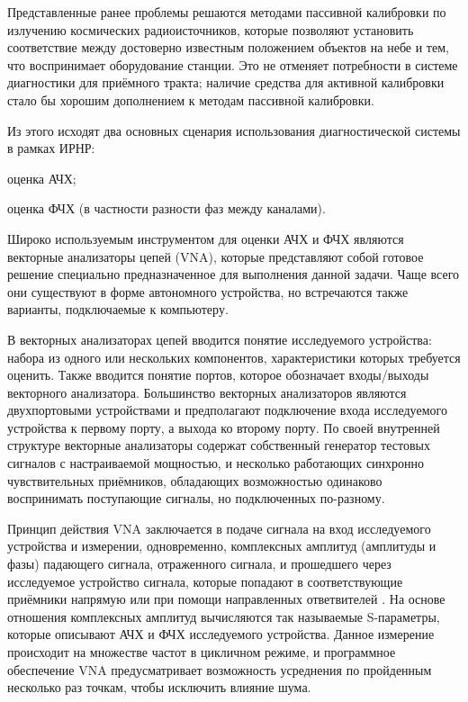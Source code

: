 \documentclass{report}
\begin{document}
Представленные ранее проблемы решаются методами пассивной калибровки по излучению космических радиоисточников, которые позволяют установить соответствие между достоверно известным положением объектов на небе и тем, что воспринимает оборудование станции. Это не отменяет потребности в системе диагностики для приёмного тракта; наличие средства для активной калибровки стало бы хорошим дополнением к методам пассивной калибровки.

Из этого исходят два основных сценария использования диагностической системы в рамках ИРНР:

\begin{enummarker}
    \item оценка АЧХ;
    \item оценка ФЧХ (в частности разности фаз между каналами).
\end{enummarker}

Широко используемым инструментом для оценки АЧХ и ФЧХ являются векторные анализаторы цепей (VNA), которые представляют собой готовое решение специально предназначенное для выполнения данной задачи. Чаще всего они существуют в форме автономного устройства, но встречаются также варианты, подключаемые к компьютеру.

В векторных анализаторах цепей вводится понятие исследуемого устройства: набора из одного или нескольких компонентов, характеристики которых требуется оценить. Также вводится понятие портов, которое обозначает входы/выходы векторного анализатора. Большинство векторных анализаторов являются двухпортовыми устройствами и предполагают подключение входа исследуемого устройства к первому порту, а выхода ко второму порту. По своей внутренней структуре векторные анализаторы содержат собственный генератор тестовых сигналов с настраиваемой мощностью, и несколько работающих синхронно чувствительных приёмников, обладающих возможностью одинаково воспринимать поступающие сигналы, но подключенных по-разному.

Принцип действия VNA заключается в подаче сигнала на вход исследуемого устройства и измерении, одновременно, комплексных амплитуд (амплитуды и фазы) падающего сигнала, отраженного сигнала, и прошедшего через исследуемое устройство сигнала, которые попадают в соответствующие приёмники напрямую или при помощи направленных ответвителей \cite{vna1}. На основе отношения комплексных амплитуд вычисляются так называемые S-параметры, которые описывают АЧХ и ФЧХ исследуемого устройства. Данное измерение происходит на множестве частот в цикличном режиме, и программное обеспечение VNA предусматривает возможность усреднения по пройденным несколько раз точкам, чтобы исключить влияние шума.
\end{document}
